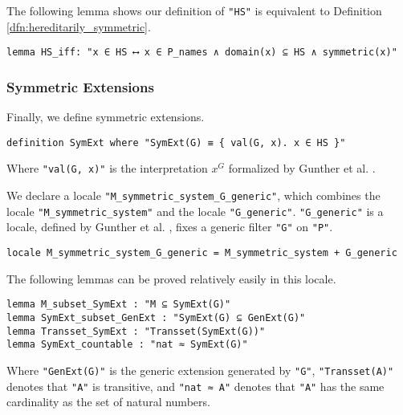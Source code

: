 \documentclass{report}
\newenvironment{isaframe}{\begin{mdframed}[topline=false, rightline=false, bottomline=false]}{\end{mdframed}}
\begin{document}
The following lemma shows our definition of \texttt{"HS"} is equivalent to Definition \ref{dfn:hereditarily_symmetric}.

\begin{isaframe}
\begin{verbatim}
lemma HS_iff: "x ∈ HS ⟷ x ∈ P_names ∧ domain(x) ⊆ HS ∧ symmetric(x)" 
\end{verbatim}
\end{isaframe}

\subsubsection{Symmetric Extensions}
Finally, we define symmetric extensions.

\begin{isaframe}
\begin{verbatim}
definition SymExt where "SymExt(G) ≡ { val(G, x). x ∈ HS }" 
\end{verbatim}
\end{isaframe}

Where \texttt{"val(G, x)"} is the interpretation $x^G$ formalized by Gunther et al. \cite{gunther_forcing}.

We declare a locale \texttt{"M\_symmetric\_system\_G\_generic"},
which combines the locale \texttt{"M\_symmetric\_system"} and the locale \texttt{"G\_generic"}.
\texttt{"G\_generic"} is a locale, defined by Gunther et al. \cite{gunther_forcing}, fixes a generic filter \texttt{"G"} on \texttt{"P"}.

\begin{isaframe}
\begin{verbatim}
locale M_symmetric_system_G_generic = M_symmetric_system + G_generic
\end{verbatim}
\end{isaframe}

The following lemmas can be proved relatively easily in this locale.

\begin{isaframe}
\begin{verbatim}
lemma M_subset_SymExt : "M ⊆ SymExt(G)" 
lemma SymExt_subset_GenExt : "SymExt(G) ⊆ GenExt(G)" 
lemma Transset_SymExt : "Transset(SymExt(G))" 
lemma SymExt_countable : "nat ≈ SymExt(G)" 
\end{verbatim}
\end{isaframe}

Where \texttt{"GenExt(G)"} is the generic extension generated by \texttt{"G"}, 
\texttt{"Transset(A)"} denotes that \texttt{"A"} is transitive, and
\texttt{"nat ≈ A"} denotes that \texttt{"A"} has the same cardinality as the set of natural numbers.
\end{document}
